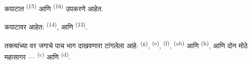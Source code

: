कपाटात  \textsuperscript{(15)} आणि
 \textsuperscript{(16)} उपकरणे आहेत.

कपाटावर आहेत:  \textsuperscript{(14)},  आणि
 \textsuperscript{(13)}.

तक्त्यांच्या वर जगाचे पाच भाग दाखवणारा  टांगलेला आहे:
 \textsuperscript{(g)},  \textsuperscript{(e)},
 \textsuperscript{(f)},  \textsuperscript{(ab)} आणि
 \textsuperscript{(h)}, आणि दोन मोठे महासागर ---
 \textsuperscript{(c)} आणि  \textsuperscript{(d)}.

\VUsaut{6.0mm}
\VUfilet{22mm}
